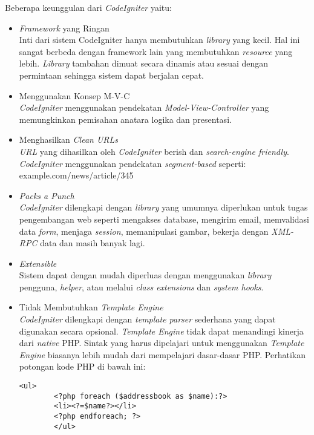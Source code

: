 Beberapa keunggulan dari \textit{CodeIgniter} yaitu:
\begin{itemize}
	\item \textit{Framework} yang Ringan \\
		Inti dari sistem CodeIgniter hanya membutuhkan \textit{library} yang kecil. Hal ini sangat berbeda dengan framework lain yang membutuhkan \textit{resource} yang lebih. \textit{Library} tambahan dimuat secara dinamis atau sesuai dengan permintaan sehingga sistem dapat berjalan cepat.
	\item Menggunakan Konsep M-V-C \\
		\textit{CodeIgniter} menggunakan pendekatan \textit{Model-View-Controller} yang memungkinkan pemisahan anatara logika dan presentasi.
	\item Menghasilkan \textit{Clean URLs} \\
		\textit{URL} yang dihasilkan oleh  \textit{CodeIgniter} berish dan \textit{search-engine friendly}. \textit{CodeIgniter} menggunakan pendekatan \textit{segment-based} seperti: \\example.com/news/article/345
	\item \textit{Packs a Punch} \\
		\textit{CodeIgniter} dilengkapi dengan \textit{library} yang umumnya diperlukan untuk tugas pengembangan web seperti mengakses database, mengirim email, memvalidasi data \textit{form}, menjaga \textit{session}, memanipulasi gambar, bekerja dengan \textit{XML-RPC} data dan masih banyak lagi.
	\item \textit{Extensible} \\
		Sistem dapat dengan mudah diperluas dengan menggunakan \textit{library} pengguna, \textit{helper}, atau melalui \textit{class extensions} dan \textit{system hooks}.
	\item Tidak Membutuhkan \textit{Template Engine} \\
		\textit{CodeIgniter} dilengkapi dengan \textit{template parser} sederhana yang dapat digunakan secara opsional. \textit{Template Engine} tidak dapat menandingi kinerja dari \textit{native} PHP. Sintak yang harus dipelajari untuk menggunakan \textit{Template Engine} biasanya lebih mudah dari mempelajari dasar-dasar PHP. Perhatikan potongan kode PHP di bawah ini: \\
		\begin{lstlisting}[backgroundcolor = \color{lightgray}]
		<ul>
		<?php foreach ($addressbook as $name):?>
		<li><?=$name?></li>
		<?php endforeach; ?>
		</ul>
		\end{lstlisting}
		

\end{itemize}
